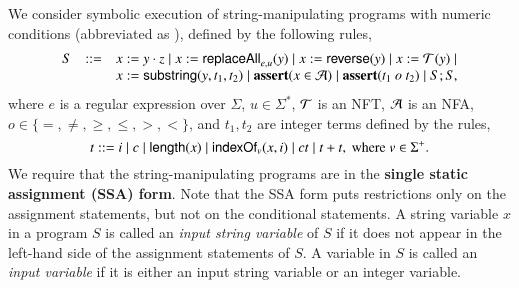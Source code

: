 
We consider symbolic execution of string-manipulating programs with numeric conditions (abbreviated as {\slint}), defined by the following rules, 
%
\[
\begin{array}{l c l}
S &::= &  x:= y \cdot z \mid x:= \mathsf{replaceAll}_{e,u}(y) \mid   x:=\mathsf{reverse}(y) \mid x:=\mathcal{T}(y) \mid \\
& & x := \mathsf{substring}(y, t_1, t_2)  \mid \textbf{assert}(x \in \mathcal{A}) \mid \textbf{assert}(t_1\ o\ t_2) \mid S;S, 
\end{array}
\]
where $e$ is a regular expression over $\Sigma$, $u \in \Sigma^*$, $\mathcal{T}$ is an NFT,  $\mathcal{A}$ is an NFA, $o \in \{=, \neq, \ge, \le, >, <\}$, and $t_1,t_2$ are integer terms defined by the rules,
\[
t  ::= i \mid c \mid \mathsf{length}(x) \mid \mathsf{indexOf}_v(x, i) \mid  ct  \mid t + t, \mbox{ where } v \in \Sigma^+.
\]
%
We require that the string-manipulating programs are in the {\bf single static assignment (SSA) form}. Note that the SSA form puts restrictions only on the assignment statements, but not on the conditional statements. 
A string variable $x$ in a {\slint} program $S$ is called an \emph{input string variable} of $S$ if it does not appear in the left-hand side of the assignment statements of $S$. A variable in $S$ is called an \emph{input variable}  if it is either an input string variable or an integer variable.

